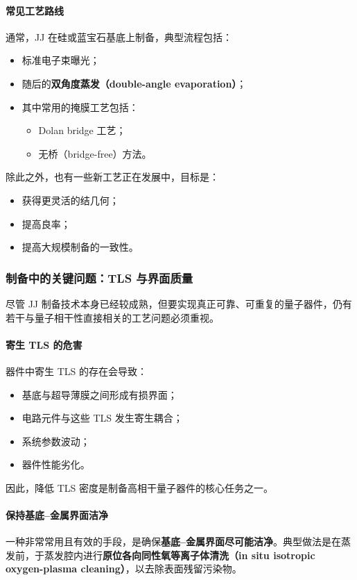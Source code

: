 \documentclass[12pt,a4paper,oneside]{ctexbook}
\begin{document}
\paragraph{常见工艺路线}
通常，JJ 在硅或蓝宝石基底上制备，典型流程包括：
\begin{itemize}
    \item 标准电子束曝光；
    \item 随后的\textbf{双角度蒸发（double-angle evaporation）}；
    \item 其中常用的掩膜工艺包括：
    \begin{itemize}
        \item Dolan bridge 工艺；
        \item 无桥（bridge-free）方法。
    \end{itemize}
\end{itemize}

除此之外，也有一些新工艺正在发展中，目标是：
\begin{itemize}
    \item 获得更灵活的结几何；
    \item 提高良率；
    \item 提高大规模制备的一致性。
\end{itemize}

\subsubsection{制备中的关键问题：TLS 与界面质量}

尽管 JJ 制备技术本身已经较成熟，但要实现真正可靠、可重复的量子器件，仍有若干与量子相干性直接相关的工艺问题必须重视。

\paragraph{寄生 TLS 的危害}
器件中寄生 TLS 的存在会导致：
\begin{itemize}
    \item 基底与超导薄膜之间形成有损界面；
    \item 电路元件与这些 TLS 发生寄生耦合；
    \item 系统参数波动；
    \item 器件性能劣化。
\end{itemize}

因此，降低 TLS 密度是制备高相干量子器件的核心任务之一。

\paragraph{保持基底--金属界面洁净}
一种非常常用且有效的手段，是确保\textbf{基底--金属界面尽可能洁净}。典型做法是在蒸发前，于蒸发腔内进行\textbf{原位各向同性氧等离子体清洗（in situ isotropic oxygen-plasma cleaning）}，以去除表面残留污染物。
\end{document}
